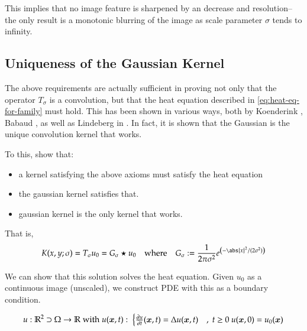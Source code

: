     This implies that no image feature is sharpened by an decrease and resolution--the only result is a monotonic blurring of the image as scale parameter $\sigma$ tends to infinity.


    \subsection{Uniqueness of the Gaussian Kernel}
    
    The above requirements are actually sufficient in proving not only that the operator $T_\sigma$ is a convolution, but that the heat equation described in \cref{eq:heat-eq-for-family} must hold. This has been shown in various ways, both by Koenderink \cite{Koenderink}, Babaud \cite{babaud}, as well as Lindeberg in \cite{GSST-book}. In fact, it is shown that the Gaussian is the unique convolution kernel that works.    
    
   To this, show that:
    \begin{itemize}
    \item a kernel satisfying the above axioms must satisfy the heat equation
  	\item the gaussian kernel satisfies that.
    \item gaussian kernel is the only kernel that works.
    \end{itemize}
    
    That is,
    \begin{equation}
   K(x,y;\sigma) = T_{\sigma} u_0 = G_\sigma \star u_0
   	\quad \textrm{where}\quad
   	G_\sigma := \frac{1}{2\pi \sigma^2} e^{\left(-\abs{x}^2 / (2\sigma^2)\right)}
    \end{equation}
    
	We can show that this solution solves the heat equation.
	Given $u_0$ as a continuous image (unscaled),
	we construct PDE with this as a boundary condition.
    
    \begin{equation}
    u: \mathbb{R}^2 \supset \Omega \to \mathbb{R} \; \textrm{with} \; u(\bm{x},t) : \;
    \begin{cases}
    \frac{\partial u}{\partial t} (\bm{x}, t) = \Delta u(\bm{x},t) & ,\; t \ge 0 \
    u(\bm{x},0) = u_0(\bm{x}) 
    \end{cases}
    \end{equation}
    
